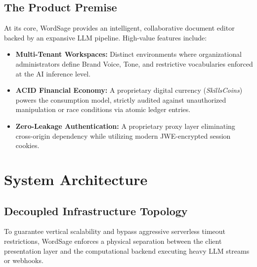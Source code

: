 \documentclass[12pt,a4paper]{report}
\begin{document}
\section{The Product Premise}
At its core, WordSage provides an intelligent, collaborative document editor backed by an expansive LLM pipeline. High-value features include:
\begin{itemize}
    \item \textbf{Multi-Tenant Workspaces:} Distinct environments where organizational administrators define Brand Voice, Tone, and restrictive vocabularies enforced at the AI inference level.
    \item \textbf{ACID Financial Economy:} A proprietary digital currency (\textit{SkillsCoins}) powers the consumption model, strictly audited against unauthorized manipulation or race conditions via atomic ledger entries.
    \item \textbf{Zero-Leakage Authentication:} A proprietary proxy layer eliminating cross-origin dependency while utilizing modern JWE-encrypted session cookies.
\end{itemize}

\chapter{System Architecture}

\section{Decoupled Infrastructure Topology}
To guarantee vertical scalability and bypass aggressive serverless timeout restrictions, WordSage enforces a physical separation between the client presentation layer and the computational backend executing heavy LLM streams or webhooks.
\end{document}
